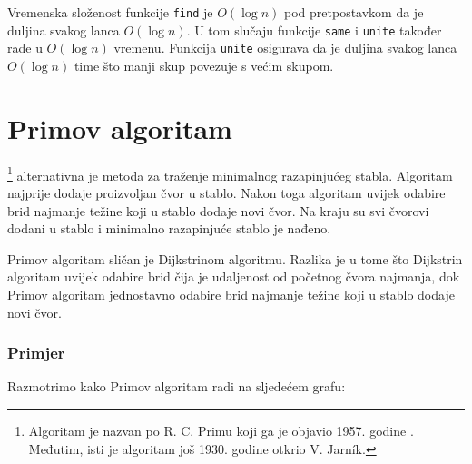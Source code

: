 Vremenska složenost funkcije \texttt{find}
je $O(\log n)$ pod pretpostavkom da je duljina svakog
lanca $O(\log n)$.
U tom slučaju funkcije \texttt{same} i \texttt{unite}
također rade u $O(\log n)$ vremenu.
Funkcija \texttt{unite} osigurava da je
duljina svakog lanca $O(\log n)$ time što
manji skup povezuje s većim skupom.

\section{Primov algoritam}


\footnote{Algoritam je
nazvan po R. C. Primu koji ga je objavio 1957. godine \cite{pri57}.
Međutim, isti je algoritam još 1930. godine otkrio
V. Jarník.} alternativna je metoda
za traženje minimalnog razapinjućeg stabla.
Algoritam najprije dodaje proizvoljan čvor
u stablo.
Nakon toga algoritam uvijek odabire
brid najmanje težine koji
u stablo dodaje novi čvor.
Na kraju su svi čvorovi dodani u stablo
i minimalno razapinjuće stablo je nađeno.

Primov algoritam sličan je Dijkstrinom algoritmu.
Razlika je u tome što Dijkstrin algoritam uvijek
odabire brid čija je udaljenost od početnog
čvora najmanja, dok Primov algoritam jednostavno odabire
brid najmanje težine koji u stablo dodaje novi čvor.

\subsubsection{Primjer}

Razmotrimo kako Primov algoritam radi
na sljedećem grafu:

